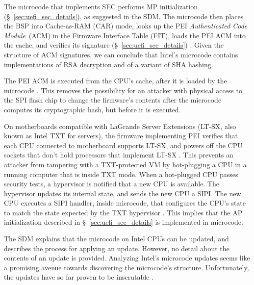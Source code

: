 The microcode that implements SEC performs MP initialization
(\S~\ref{sec:uefi_sec_details}), as suggested in the SDM. The microcode then
places the BSP into Cache-as-RAM (CAR) mode, looks up the PEI
\textit{Authenticated Code Module}~(ACM) in the Firmware Interface Table (FIT),
loads the PEI ACM into the cache, and verifies its signature
(\S~\ref{sec:uefi_sec_details}) \cite{datta2010trustedboot, intel2012patching,
intel2012uefihypervisor, intel2012ltsx, datta2013acm}. Given the structure of
ACM signatures, we can conclude that Intel's microcode contains implementations
of RSA decryption and of a variant of SHA hashing.

The PEI ACM is executed from the CPU's cache, after it is loaded by the
microcode \cite{datta2010trustedboot, intel2012patching, datta2013acm}. This
removes the possibility for an attacker with physical access to the SPI flash
chip to change the firmware's contents after the microcode computes its
cryptographic hash, but before it is executed.


On motherboards compatible with LaGrande Server Extensions (LT-SX, also known
as Intel TXT for servers), the firmware implementing PEI verifies that each CPU
connected to motherboard supports LT-SX, and powers off the CPU sockets that
don't hold processors that implement LT-SX \cite{intel2012ltsx}. This prevents
an attacker from tampering with a TXT-protected VM by hot-plugging a CPU in a
running computer that is inside TXT mode. When a hot-plugged CPU passes
security tests, a hypervisor is notified that a new CPU is available. The
hypervisor updates its internal state, and sends the new CPU a SIPI. The new
CPU executes a SIPI handler, inside microcode, that configures the CPU's state
to match the state expected by the TXT hypervisor \cite{intel2012ltsx}. This
implies that the AP initialization described in \S~\ref{sec:uefi_sec_details}
is implemented in microcode.


\label{microcode:updates}

The SDM explains that the microcode on Intel CPUs can be updated, and describes
the process for applying an update. However, no detail about the contents of an
update is provided. Analyzing Intel's microcode updates seems like a promising
avenue towards discovering the microcode's structure. Unfortunately, the
updates have so far proven to be inscrutable \cite{chen2014microcode}.

